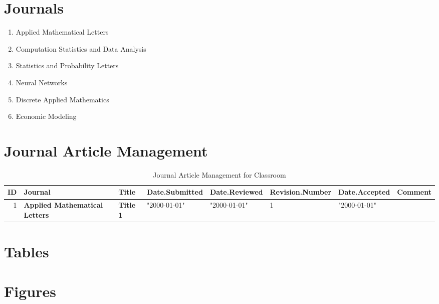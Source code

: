 

\section{Journals}

\begin{enumerate}
\item Applied Mathematical Letters \cite{key1}
\item Computation Statistics and Data Analysis \cite{key2}
\item Statistics and Probability Letters \cite{key3}
\item Neural Networks \cite{key4}
\item Discrete Applied Mathematics \cite{key5}
\item Economic Modeling \cite{key6}
\end{enumerate}


\section{Journal Article Management}


\begin{table}[ht]
\caption{Journal Article Management for Classroom}
\begin{tabular}{rlllllll}
\hline
ID & Journal & Title & Date.Submitted & Date.Reviewed & Revision.Number & Date.Accepted & Comment \\
\hline
1 & \textbf{Applied Mathematical Letters} \cite{key1} & \textbf{Title 1} & "2000-01-01" & "2000-01-01" & 1 & "2000-01-01" & \\
\hline
\end{tabular}
\end{table}


\section{Tables}


\section{Figures}



